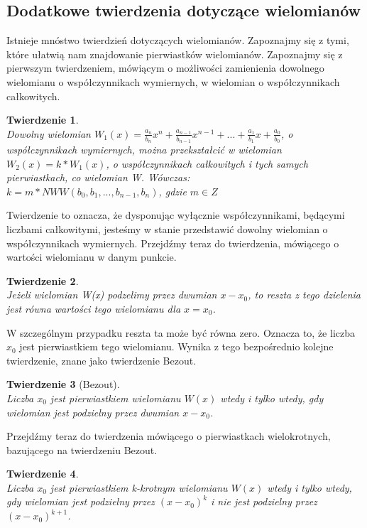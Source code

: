 \documentclass[twoside,a4paper]{book}
\newtheorem{theorem}{Twierdzenie}
\begin{document}
\subsection{Dodatkowe twierdzenia dotyczące wielomianów}

Istnieje mnóstwo twierdzień dotyczących wielomianów. Zapoznajmy się z tymi, które ułatwią nam znajdowanie pierwiastków wielomianów. Zapoznajmy się z pierwszym twierdzeniem, mówiącym o możliwości zamienienia dowolnego wielomianu o współczynnikach wymiernych, w wielomian o współczynnikach całkowitych.

\begin{theorem}
	$ $\\
	Dowolny wielomian $W_1(x) = \frac{a_n}{b_n}x^n + \frac{a_{n-1}}{b_{n-1}}x^{n-1} + ... + \frac{a_1}{b_1}x + \frac{a_0}{b_0}$, o współczynnikach wymiernych, można przekształcić w wielomian $W_2(x) = k * W_1(x)$, o współczynnikach całkowitych i tych samych pierwiastkach, co wielomian W. Wówczas: \\
	$k = m * NWW(b_0, b_1, ..., b_{n-1}, b_n)$, gdzie $m\in Z$
\end{theorem}

Twierdzenie to oznacza, że dysponując wyłącznie współczynnikami, będącymi liczbami całkowitymi, jesteśmy w stanie przedstawić dowolny wielomian o współczynnikach wymiernych. Przejdźmy teraz do twierdzenia, mówiącego o wartości wielomianu w danym punkcie.

\begin{theorem}
	$ $\\
	Jeżeli wielomian W(x) podzelimy przez dwumian $x - x_0$, to reszta z tego dzielenia jest równa wartości tego wielomianu dla $x = x_0$.
\end{theorem}

W szczególnym przypadku reszta ta może być równa zero. Oznacza to, że liczba $x_0$ jest pierwiastkiem tego wielomianu. Wynika z tego bezpośrednio kolejne twierdzenie, znane jako twierdzenie Bezout.

\begin{theorem}[Bezout]
	$ $\\
	Liczba $x_0$ jest pierwiastkiem wielomianu $W(x)$ wtedy i tylko wtedy, gdy wielomian jest podzielny przez dwumian $x - x_0$.
\end{theorem}

Przejdźmy teraz do twierdzenia mówiącego o pierwiastkach wielokrotnych, bazującego na twierdzeniu Bezout.

\begin{theorem}
	$ $\\
	Liczba $x_0$ jest pierwiastkiem k-krotnym wielomianu $W(x)$ wtedy i tylko wtedy, gdy wielomian jest podzielny przez $(x - x_0)^k$ i nie jest podzielny przez $(x - x_0)^{k+1}$.
\end{theorem}
\end{document}
